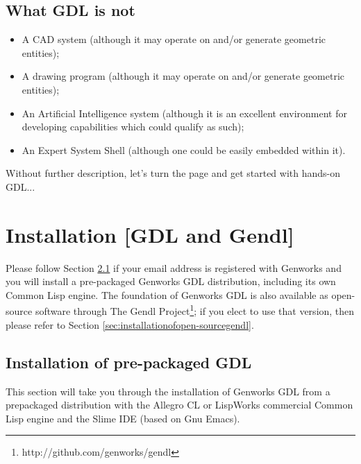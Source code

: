 \documentclass [11pt]{book}
\begin{document}
\section{What GDL is not}

\label{sec:whatgdlisnot}



\begin{itemize}

\item A CAD system (although it may operate on and/or generate geometric entities);

\item A drawing program (although it may operate on and/or generate geometric entities);

\item An Artificial Intelligence system (although it is an
excellent environment for developing capabilities which could qualify
as such);

\item An Expert System Shell (although one could be easily embedded within it).

\end{itemize}

Without further description, let's turn the page and get
      started with hands-on GDL...

\chapter{Installation [GDL and Gendl]}

\label{chap:installation[gdlandgendl]}

Please follow Section 
\ref{sec:installationofpre-packagedgdl} if your email address is registered with Genworks and you will
install a pre-packaged Genworks GDL distribution, including its own
Common Lisp engine.  The foundation of Genworks GDL is also available
as open-source software through The Gendl Project\footnote{http://github.com/genworks/gendl}; if you elect to use that version, then please refer to Section 
\ref{sec:installationofopen-sourcegendl}.

\section{Installation of pre-packaged GDL}

\label{sec:installationofpre-packagedgdl}

This section will take you through the installation of
Genworks GDL from a prepackaged distribution with the Allegro CL or
LispWorks commercial Common Lisp engine and the Slime IDE (based on
Gnu Emacs).
\end{document}
